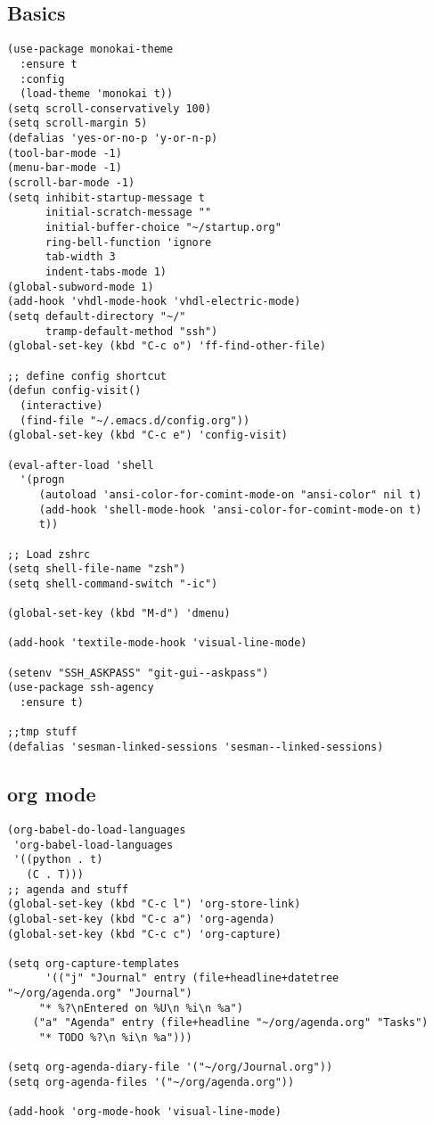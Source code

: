 \documentclass[11pt]{article}
\begin{document}
\subsection{Basics}
\label{sec-1-3}
\begin{verbatim}
(use-package monokai-theme
  :ensure t
  :config
  (load-theme 'monokai t))
(setq scroll-conservatively 100)
(setq scroll-margin 5)
(defalias 'yes-or-no-p 'y-or-n-p)
(tool-bar-mode -1)
(menu-bar-mode -1)
(scroll-bar-mode -1)
(setq inhibit-startup-message t
      initial-scratch-message ""
      initial-buffer-choice "~/startup.org"
      ring-bell-function 'ignore
      tab-width 3
      indent-tabs-mode 1)
(global-subword-mode 1)
(add-hook 'vhdl-mode-hook 'vhdl-electric-mode)
(setq default-directory "~/"
      tramp-default-method "ssh")
(global-set-key (kbd "C-c o") 'ff-find-other-file)

;; define config shortcut
(defun config-visit()
  (interactive)
  (find-file "~/.emacs.d/config.org"))
(global-set-key (kbd "C-c e") 'config-visit)

(eval-after-load 'shell
  '(progn
     (autoload 'ansi-color-for-comint-mode-on "ansi-color" nil t)
     (add-hook 'shell-mode-hook 'ansi-color-for-comint-mode-on t)
     t))

;; Load zshrc
(setq shell-file-name "zsh")
(setq shell-command-switch "-ic")

(global-set-key (kbd "M-d") 'dmenu)

(add-hook 'textile-mode-hook 'visual-line-mode)

(setenv "SSH_ASKPASS" "git-gui--askpass")
(use-package ssh-agency
  :ensure t)

;;tmp stuff
(defalias 'sesman-linked-sessions 'sesman--linked-sessions)
\end{verbatim}
\subsection{org mode}
\label{sec-1-4}
\begin{verbatim}
(org-babel-do-load-languages
 'org-babel-load-languages
 '((python . t)
   (C . T)))
;; agenda and stuff
(global-set-key (kbd "C-c l") 'org-store-link)
(global-set-key (kbd "C-c a") 'org-agenda)
(global-set-key (kbd "C-c c") 'org-capture)

(setq org-capture-templates
      '(("j" "Journal" entry (file+headline+datetree "~/org/agenda.org" "Journal")
	 "* %?\nEntered on %U\n %i\n %a")
	("a" "Agenda" entry (file+headline "~/org/agenda.org" "Tasks")
	 "* TODO %?\n %i\n %a")))

(setq org-agenda-diary-file '("~/org/Journal.org"))
(setq org-agenda-files '("~/org/agenda.org")) 

(add-hook 'org-mode-hook 'visual-line-mode)
\end{verbatim}
\end{document}

